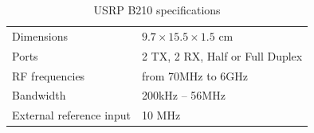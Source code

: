 
\begin{table}[]
	\centering
	\caption{USRP B210 specifications}
	\begin{tabular}{ll}
		\toprule
		Dimensions               & \(9.7 \times 15.5 \times 1.5\) cm \\
		Ports                    & 2 TX, 2 RX, Half or Full Duplex     \\
		RF frequencies           & from 70MHz to 6GHz                    \\
		Bandwidth                & 200kHz -- 56MHz                       \\
		External reference input & 10 MHz                                \\
		\bottomrule
	\end{tabular}
\label{tab:USRP B210 specifications}
\end{table}
